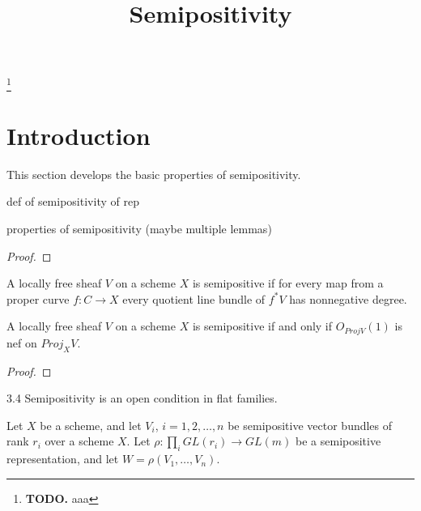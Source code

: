 


\newcommand{\todo}[1]{\footnote{\textbf{TODO.} #1}}

\title{Semipositivity}
\maketitle

\todo{aaa}


\section{Introduction}
This section develops the basic properties of semipositivity.


\begin{definition}
def of semipositivity of rep
\end{definition}

\begin{lemma}
properties of semipositivity (maybe multiple lemmas)
\end{lemma}


\begin{proof}

\end{proof}


\begin{definition}
A locally free sheaf $V$ on a scheme $X$ is semipositive if for every map from a proper curve $f:C\to X$ every quotient line bundle of $f^*V$ has nonnegative degree.
\end{definition}

\begin{lemma}
A locally free sheaf $V$ on a scheme $X$ is semipositive if and only if $O_{Proj V}(1)$ is nef on $Proj_XV$.
\end{lemma}
\begin{proof}

\end{proof}

\begin{lemma}
3.4 Semipositivity is an open condition in flat families.
\end{lemma}

\begin{lemma}
Let $X$ be a scheme, and let $V_i$, $i=1,2,\ldots,n$ be semipositive vector bundles of rank $r_i$ over a scheme $X$. Let $\rho:\prod_i GL(r_i)\to GL(m)$ be a semipositive representation, and let $W=\rho(V_1,\ldots,V_n)$. 
\end{lemma}

